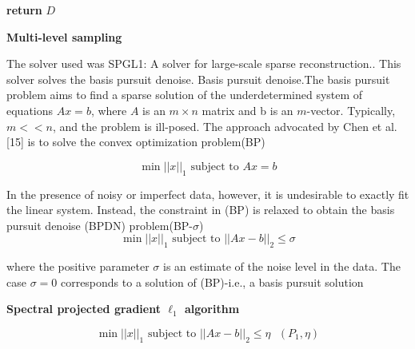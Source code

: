 \documentclass{article}
\begin{document}
\begin{algorithm}[h]





\textbf{return} $D$ 
\caption{{\bf Multi-level sampling} \label{Algorithm multi-level}}
\end{algorithm}



The solver used was SPGL1: A solver for large-scale sparse reconstruction.\cite{spgl1:2007}. This solver solves the basis pursuit denoise. Basis  pursuit  denoise.The basis pursuit problem aims to find a sparse solution of the underdetermined system of equations $Ax=b$, where $A$ is an $m \times n$ matrix and b is an $m$-vector.  Typically,$m << n$, and the problem is ill-posed.  The approach advocated by Chen et al. [15] is to solve the convex optimization problem(BP)

\begin{equation}
\min ||x||_1 \text{ subject to } Ax = b 
\end{equation}

In the presence of noisy or imperfect data, however, it is undesirable to exactly fit the linear system. Instead, the constraint in (BP) is relaxed to obtain the basis pursuit denoise (BPDN) problem(BP-$\sigma$)
\begin{equation}
\min ||x||_1 \text{ subject to } ||Ax-b||_2\leq  \sigma
\end{equation}

where the positive parameter $\sigma$ is an estimate of the noise level in the data.  The case $\sigma = 0$ corresponds to a solution of (BP)-i.e., a basis pursuit solution

\textbf{Spectral projected gradient $\ell_1$  algorithm}

\begin{equation}
\min ||x||_1 \text{ subject to } ||Ax-b||_2 \leq \eta  \text{              }     (P_1,{\eta})  
\end{equation}
\end{document}
